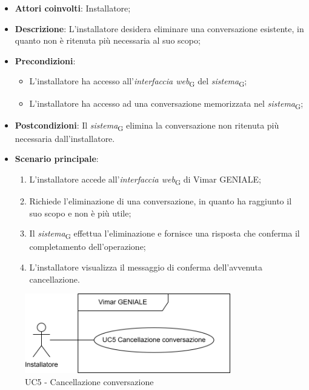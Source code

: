 \begin{itemize}
    \item \textbf{Attori coinvolti}: Installatore;
    \item \textbf{Descrizione}: L’installatore desidera eliminare una conversazione esistente, in quanto non è ritenuta più necessaria al suo scopo;
    \item \textbf{Precondizioni}: 
        \begin{itemize}
            \item L’installatore ha accesso all’\textit{interfaccia web}\textsubscript{G} del \textit{sistema}\textsubscript{G};
            \item L’installatore ha accesso ad una conversazione memorizzata nel \textit{sistema}\textsubscript{G};
        \end{itemize}
    \item \textbf{Postcondizioni}: Il \textit{sistema}\textsubscript{G} elimina la conversazione non ritenuta più necessaria dall’installatore.
    \item \textbf{Scenario principale}:
    \begin{enumerate}
    \item L’installatore accede all’\textit{interfaccia web}\textsubscript{G} di Vimar GENIALE;
    \item Richiede l’eliminazione di una conversazione, in quanto ha raggiunto il suo scopo e non è più utile;
    \item Il \textit{sistema}\textsubscript{G} effettua l’eliminazione e fornisce una risposta che conferma il completamento dell’operazione;
    \item L’installatore visualizza il messaggio di conferma dell’avvenuta cancellazione.
    \end{enumerate}
\end{itemize}
\begin{figure}[H]
\centering
\includegraphics[width=0.8\textwidth]{contents/casi_duso/png/UC5.png}
\caption{UC5 - Cancellazione conversazione}
\end{figure}


